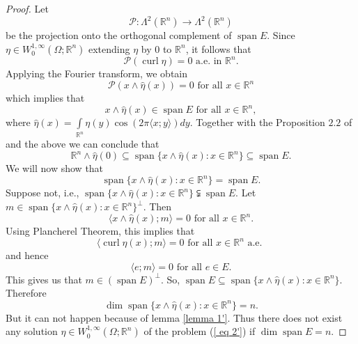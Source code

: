 \documentclass[11pt, a4paper, reqno]{amsart}
\numberwithin{equation}{section}
\newcommand{\spann}{\operatorname{span}}
\newcommand{\curl}{\operatorname{curl}}
\begin{document}
\begin{proof}
Let $$\mathcal P: \Lambda^2({\mathbb R^n})\to \Lambda^2(\mathbb R^n)$$
be the projection onto the orthogonal complement of $\spann E.$ Since $\eta \in W_{0}^{1,\infty}(\Omega;\mathbb R^n)$ extending $\eta $ by $0$ to $\mathbb R^n$, it follows that $$\mathcal P(\curl \eta)=0 \textrm{ a.e. in }\mathbb R^n.$$
Applying the Fourier transform, we obtain $$\mathcal P(x\wedge \hat{\eta}(x))=0 \textrm{ for all }x\in \mathbb R^n$$
which implies that $$x\wedge \hat{ \eta}(x)\in \spann E \textrm{ for all } x\in \mathbb R^n,$$
where $\hat{ \eta}(x)=\displaystyle \int\limits_{\mathbb R^n}\eta(y)\cos (2\pi \langle x;y \rangle) dy.$ Together with the Proposition $2.2$ of \cite{bandyopadhyay2015some} and the above we can conclude that  
\begin{equation}\label{eq 3'}
    \mathbb R^n \wedge \hat{ \eta}(0)\subseteq \spann \{x\wedge \hat{ \eta}(x): x\in \mathbb R^n\}\subseteq \spann E.
\end{equation}
We will now show that $$\spann \{x\wedge \hat{ \eta}(x):x\in \mathbb R^n\}=\spann E.$$
Suppose not, i.e., $\spann \{x\wedge \hat{\eta}(x): x\in \mathbb R^n\}\subsetneqq \spann E$. 
Let $m\in \spann \{x\wedge \hat{ \eta}(x):x\in \mathbb R^n\}^{\perp}$. Then 
$$\langle x\wedge \hat{\eta} (x);m\rangle =0 \textrm{ for all } x\in \mathbb R^n.$$
Using Plancherel Theorem, this implies that $$\langle \curl \eta (x);m \rangle =0\textrm{ for all } x\in \mathbb R^n \textrm{ a.e. } $$
and hence $$\langle e;m \rangle =0 \textrm{ for all }e\in E.$$  This gives us that $m\in (\spann E)^{\perp}.$ So, $\spann E\subseteq \spann \{x\wedge \hat{\eta}(x): x\in \mathbb R^n\}$.
Therefore $$\dim \spann\{x\wedge \hat{\eta}(x): x\in \mathbb R^n\}=n.$$
But it can not happen because of lemma  \ref{lemma 1'}. Thus there does not exist any solution $\eta \in W_{0}^{1,\infty}(\Omega;\mathbb R^n)$ of the problem (\ref{ eq 2'}) if $\dim \spann E=n.$
\end{proof}
\end{document}
